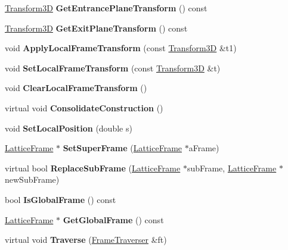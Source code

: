\begin{DoxyCompactItemize}
\item 
\mbox{\label{classLatticeFrame_ac877f58ec71c7a759ede049bb7991e3d}} 
\hyperlink{classTransform3D}{Transform3D} {\bfseries Get\+Entrance\+Plane\+Transform} () const
\item 
\mbox{\label{classLatticeFrame_a6c210dce6355bc321156c6a77379210e}} 
\hyperlink{classTransform3D}{Transform3D} {\bfseries Get\+Exit\+Plane\+Transform} () const
\item 
\mbox{\label{classLatticeFrame_aade2aa81a0d3b4c8612bad772af5e643}} 
void {\bfseries Apply\+Local\+Frame\+Transform} (const \hyperlink{classTransform3D}{Transform3D} \&t1)
\item 
\mbox{\label{classLatticeFrame_a257523e508b033ccf55ba10e4ba89898}} 
void {\bfseries Set\+Local\+Frame\+Transform} (const \hyperlink{classTransform3D}{Transform3D} \&t)
\item 
\mbox{\label{classLatticeFrame_a430b99d6e7f32c2a59210a19d5d556e0}} 
void {\bfseries Clear\+Local\+Frame\+Transform} ()
\item 
\mbox{\label{classLatticeFrame_aa65df79513fa6b8a4b9b37396b9d53d1}} 
virtual void {\bfseries Consolidate\+Construction} ()
\item 
\mbox{\label{classLatticeFrame_a9a593cc4a3c66399dc8b2b57dab6c225}} 
void {\bfseries Set\+Local\+Position} (double s)
\item 
\mbox{\label{classLatticeFrame_a80c96880eaf32959e7beb65f69078aae}} 
\hyperlink{classLatticeFrame}{Lattice\+Frame} $\ast$ {\bfseries Set\+Super\+Frame} (\hyperlink{classLatticeFrame}{Lattice\+Frame} $\ast$a\+Frame)
\item 
\mbox{\label{classLatticeFrame_a6cf4b97853eb405ae52ff228e4edfe67}} 
virtual bool {\bfseries Replace\+Sub\+Frame} (\hyperlink{classLatticeFrame}{Lattice\+Frame} $\ast$sub\+Frame, \hyperlink{classLatticeFrame}{Lattice\+Frame} $\ast$new\+Sub\+Frame)
\item 
\mbox{\label{classLatticeFrame_a0db4335ecfff72e707b262f85559ba6b}} 
bool {\bfseries Is\+Global\+Frame} () const
\item 
\mbox{\label{classLatticeFrame_ae1579cc6358b34369152a21978073fd2}} 
\hyperlink{classLatticeFrame}{Lattice\+Frame} $\ast$ {\bfseries Get\+Global\+Frame} () const
\item 
\mbox{\label{classLatticeFrame_a9b75d74badb354a8c3c407f00b8a346c}} 
virtual void {\bfseries Traverse} (\hyperlink{classFrameTraverser}{Frame\+Traverser} \&ft)
\end{DoxyCompactItemize}
